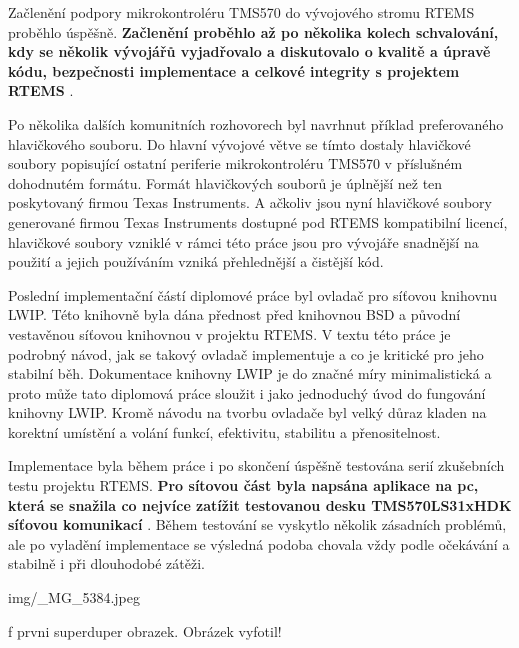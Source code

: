 Začlenění podpory mikrokontroléru TMS570 do vývojového stromu RTEMS proběhlo úspěšně.
{\bf Začlenění proběhlo až po několika kolech schvalování, kdy se několik vývojářů vyjadřovalo a diskutovalo o kvalitě a úpravě kódu, bezpečnosti implementace a celkové integrity s projektem RTEMS }.

Po několika dalších komunitních rozhovorech byl navrhnut příklad preferovaného hlavičkového souboru. Do hlavní vývojové větve se tímto dostaly hlavičkové soubory popisující ostatní periferie mikrokontroléru TMS570 v příslušném dohodnutém formátu. Formát hlavičkových souborů je úplnější než ten poskytovaný firmou Texas Instruments. A ačkoliv jsou nyní hlavičkové soubory generované firmou Texas Instruments dostupné pod RTEMS kompatibilní licencí, hlavičkové soubory vzniklé v rámci této práce jsou pro vývojáře snadnější na použití a jejich používáním vzniká přehlednější a čistější kód. 

Poslední implementační částí diplomové práce byl ovladač pro síťovou knihovnu LWIP. Této knihovně byla dána přednost před knihovnou BSD a původní vestavěnou síťovou knihovnou v projektu RTEMS. V textu této práce je podrobný návod, jak se takový ovladač implementuje a co je kritické pro jeho stabilní běh. Dokumentace knihovny LWIP je do značné míry minimalistická a proto může tato diplomová práce sloužit i jako jednoduchý úvod do fungování knihovny LWIP. Kromě návodu na tvorbu ovladače byl velký důraz kladen na korektní umístění a volání funkcí, efektivitu, stabilitu a přenositelnost.

Implementace byla během práce i po skončení úspěšně testována serií zkušebních testu projektu RTEMS. {\bf Pro sítovou část byla napsána aplikace na pc, která se snažila co nejvíce zatížit testovanou desku TMS570LS31xHDK síťovou komunikací }. Během testování se vyskytlo několik zásadních problémů, ale po vyladění implementace se výsledná podoba chovala vždy podle očekávání a stabilně i při dlouhodobé zátěži.



\medskip
{}
\picw=13cm \cinspic img/_MG_5384.jpeg
\caption/f prvni superduper obrazek. Obrázek vyfotil!
\medskip

\bye
\grid
